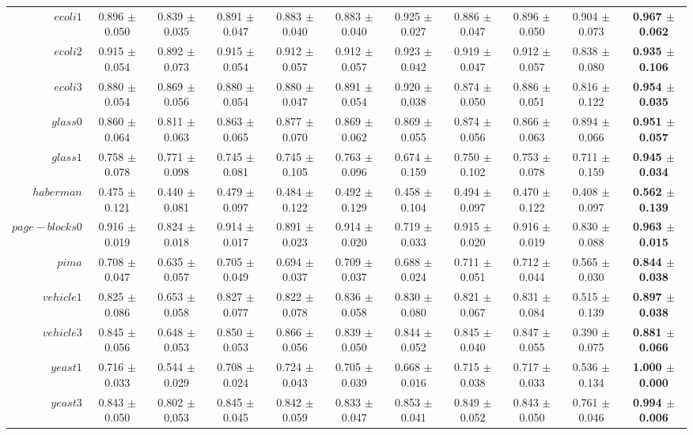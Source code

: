 \begin{table}[!ht]
{\begin{tabular}{r c c c c c c c c c c}
$ecoli1$ & 0.896 $\pm$ 0.050 & 0.839 $\pm$ 0.035 & 0.891 $\pm$ 0.047 & 0.883 $\pm$ 0.040 & 0.883 $\pm$ 0.040 & 0.925 $\pm$ 0.027 & 0.886 $\pm$ 0.047 & 0.896 $\pm$ 0.050 & 0.904 $\pm$ 0.073 & \textbf{0.967 $\pm$ 0.062} \\
$ecoli2$ & 0.915 $\pm$ 0.054 & 0.892 $\pm$ 0.073 & 0.915 $\pm$ 0.054 & 0.912 $\pm$ 0.057 & 0.912 $\pm$ 0.057 & 0.923 $\pm$ 0.042 & 0.919 $\pm$ 0.047 & 0.912 $\pm$ 0.057 & 0.838 $\pm$ 0.080 & \textbf{0.935 $\pm$ 0.106} \\
$ecoli3$ & 0.880 $\pm$ 0.054 & 0.869 $\pm$ 0.056 & 0.880 $\pm$ 0.054 & 0.880 $\pm$ 0.047 & 0.891 $\pm$ 0.054 & 0.920 $\pm$ 0.038 & 0.874 $\pm$ 0.050 & 0.886 $\pm$ 0.051 & 0.816 $\pm$ 0.122 & \textbf{0.954 $\pm$ 0.035} \\
$glass0$ & 0.860 $\pm$ 0.064 & 0.811 $\pm$ 0.063 & 0.863 $\pm$ 0.065 & 0.877 $\pm$ 0.070 & 0.869 $\pm$ 0.062 & 0.869 $\pm$ 0.055 & 0.874 $\pm$ 0.056 & 0.866 $\pm$ 0.063 & 0.894 $\pm$ 0.066 & \textbf{0.951 $\pm$ 0.057} \\
$glass1$ & 0.758 $\pm$ 0.078 & 0.771 $\pm$ 0.098 & 0.745 $\pm$ 0.081 & 0.745 $\pm$ 0.105 & 0.763 $\pm$ 0.096 & 0.674 $\pm$ 0.159 & 0.750 $\pm$ 0.102 & 0.753 $\pm$ 0.078 & 0.711 $\pm$ 0.159 & \textbf{0.945 $\pm$ 0.034} \\
$haberman$ & 0.475 $\pm$ 0.121 & 0.440 $\pm$ 0.081 & 0.479 $\pm$ 0.097 & 0.484 $\pm$ 0.122 & 0.492 $\pm$ 0.129 & 0.458 $\pm$ 0.104 & 0.494 $\pm$ 0.097 & 0.470 $\pm$ 0.122 & 0.408 $\pm$ 0.097 & \textbf{0.562 $\pm$ 0.139} \\
$page-blocks0$ & 0.916 $\pm$ 0.019 & 0.824 $\pm$ 0.018 & 0.914 $\pm$ 0.017 & 0.891 $\pm$ 0.023 & 0.914 $\pm$ 0.020 & 0.719 $\pm$ 0.033 & 0.915 $\pm$ 0.020 & 0.916 $\pm$ 0.019 & 0.830 $\pm$ 0.088 & \textbf{0.963 $\pm$ 0.015} \\
$pima$ & 0.708 $\pm$ 0.047 & 0.635 $\pm$ 0.057 & 0.705 $\pm$ 0.049 & 0.694 $\pm$ 0.037 & 0.709 $\pm$ 0.037 & 0.688 $\pm$ 0.024 & 0.711 $\pm$ 0.051 & 0.712 $\pm$ 0.044 & 0.565 $\pm$ 0.030 & \textbf{0.844 $\pm$ 0.038} \\
$vehicle1$ & 0.825 $\pm$ 0.086 & 0.653 $\pm$ 0.058 & 0.827 $\pm$ 0.077 & 0.822 $\pm$ 0.078 & 0.836 $\pm$ 0.058 & 0.830 $\pm$ 0.080 & 0.821 $\pm$ 0.067 & 0.831 $\pm$ 0.084 & 0.515 $\pm$ 0.139 & \textbf{0.897 $\pm$ 0.038} \\
$vehicle3$ & 0.845 $\pm$ 0.056 & 0.648 $\pm$ 0.053 & 0.850 $\pm$ 0.053 & 0.866 $\pm$ 0.056 & 0.839 $\pm$ 0.050 & 0.844 $\pm$ 0.052 & 0.845 $\pm$ 0.040 & 0.847 $\pm$ 0.055 & 0.390 $\pm$ 0.075 & \textbf{0.881 $\pm$ 0.066} \\
$yeast1$ & 0.716 $\pm$ 0.033 & 0.544 $\pm$ 0.029 & 0.708 $\pm$ 0.024 & 0.724 $\pm$ 0.043 & 0.705 $\pm$ 0.039 & 0.668 $\pm$ 0.016 & 0.715 $\pm$ 0.038 & 0.717 $\pm$ 0.033 & 0.536 $\pm$ 0.134 & \textbf{1.000 $\pm$ 0.000} \\
$yeast3$ & 0.843 $\pm$ 0.050 & 0.802 $\pm$ 0.053 & 0.845 $\pm$ 0.045 & 0.842 $\pm$ 0.059 & 0.833 $\pm$ 0.047 & 0.853 $\pm$ 0.041 & 0.849 $\pm$ 0.052 & 0.843 $\pm$ 0.050 & 0.761 $\pm$ 0.046 & \textbf{0.994 $\pm$ 0.006} \\
\end{tabular}}
\end{table}
